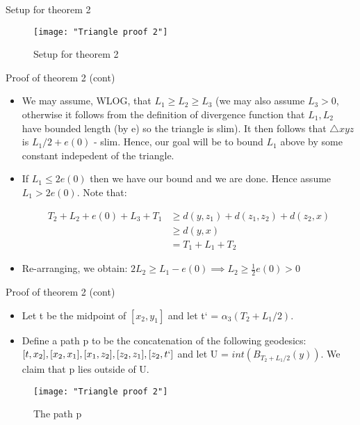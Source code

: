 \documentclass[11pt]{beamer}
\begin{document}
	\begin{frame}{Setup for theorem 2}
		
\begin{figure}
	\centering
	\texttt{[image: "Triangle proof 2"]}
	\caption{Setup for theorem 2}
	\label{fig:triangle-proof-2}
\end{figure}
		
	\end{frame}
	
	\begin{frame}{Proof of theorem 2 (cont)}
		
		\begin{itemize}
			\item We may assume, WLOG, that $L_1 \geq L_2 \geq L_3$ (we may also assume $L_3 > 0$, otherwise it follows from the definition of divergence function that $L_1, L_2$ have bounded length (by e) so the triangle is slim). It then follows that $\triangle xyz$ is $ L_1/2 + e(0)$ - slim. Hence, our goal will be to bound $L_1$ above by some constant indepedent of the triangle. 
			\item If $L_1 \leq 2e(0)$ then we have our bound and we are done. Hence assume $L_1 > 2e(0)$. Note that:
			
			\begin{align*}
			T_2 + L_2 + e(0) + L_3 + T_1 &\geq d(y, z_1) + d(z_1, z_2) + d(z_2, x) \\
			&\geq d(y, x) \\
			&= T_1 + L_1 + T_2
			\end{align*}
			
			\item Re-arranging, we obtain: $2L_2 \geq L_1 - e(0) \implies L_2 \geq \frac{1}{2} e(0) > 0$
		\end{itemize}
		
	\end{frame}
	
	\begin{frame}{Proof of theorem 2 (cont)}
		
		\begin{itemize}
			\item Let t be the midpoint of $[x_2, y_1]$ and let t` = $\alpha_3 (T_2 + L_1/2)$. 
			
			\item Define a path p to be the concatenation of the following geodesics: $[t, x_2], [x_2, x_1], [x_1, z_2], [z_2, z_1],[z_2, t`]$ and let U = $int(B_{T_2 + L_1/2}(y))$. We claim that p lies outside of U. 
		\end{itemize}
	
	\begin{figure}
		\centering
		\texttt{[image: "Triangle proof 2"]}
		\caption{The path p}
		\label{fig:triangle-proof-2}
	\end{figure}
	
	\end{frame}
	
\end{document}
